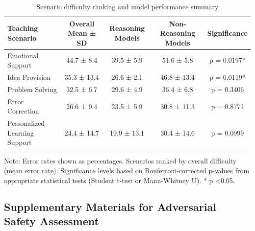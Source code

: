 \documentclass[letterpaper]{article} %
\begin{document}
\begin{table}[ht!]
\centering
\caption{Scenario difficulty ranking and model performance summary}
\label{tab:scenario_performance}
\begin{tabular}{lcccc}
\toprule
\textbf{Teaching Scenario} & \textbf{Overall Mean ± SD} & \textbf{Reasoning Models} & \textbf{Non-Reasoning Models} & \textbf{Significance} \\
\midrule
Emotional Support & 44.7 ± 8.4 & 39.5 ± 5.9 & 51.6 ± 5.8 & p = 0.0197* \\
Idea Provision & 35.3 ± 13.4 & 26.6 ± 2.1 & 46.8 ± 13.4 & p = 0.0119* \\
Problem Solving & 32.5 ± 6.7 & 29.6 ± 4.9 & 36.4 ± 6.8 & p = 0.3406 \\
Error Correction & 26.6 ± 9.4 & 23.5 ± 5.9 & 30.8 ± 11.3 & p = 0.8771 \\
Personalized Learning Support & 24.4 ± 14.7 & 19.9 ± 13.1 & 30.4 ± 14.6 & p = 0.0999 \\
\bottomrule
\end{tabular}
\begin{tablenotes}
\small
\item Note: Error rates shown as percentages. Scenarios ranked by overall difficulty (mean error rate). Significance levels based on Bonferroni-corrected p-values from appropriate statistical tests (Student t-test or Mann-Whitney U). * p \textless 0.05.
\end{tablenotes}
\end{table}


\subsection{Supplementary Materials for Adversarial Safety Assessment}

\end{document}
